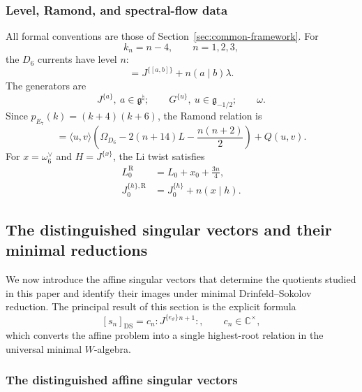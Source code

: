 \documentclass[11pt,reqno]{amsart}
\theoremstyle{definition}
\theoremstyle{remark}
\begin{document}
\subsubsection{Level, Ramond, and spectral-flow data}


All formal conventions are those of Section~\ref{sec:common-framework}.  For
\begin{equation*}
 k_n=n-4,\qquad n=1,2,3,
\end{equation*}
the $D_6$ currents have level $n$:
\begin{equation}
 [J^{\{a\}}{}_{\lambda}J^{\{b\}}]
 =J^{\{[a,b]\}}+n(a\mid b)\lambda.
 \label{e7:eq:E7-D6-current-relation-n}
\end{equation}
The generators are
\begin{equation}
 J^{\{a\}},\ a\in\mathfrak g^\natural;
 \qquad G^{\{u\}},\ u\in\mathfrak g_{-1/2};
 \qquad \omega.
 \label{e7:eq:E7-minimal-W-strong-generators}
\end{equation}
Since $p_{E_7}(k)=(k+4)(k+6)$, the Ramond relation is
\begin{equation}
 [u,v]=\langle u,v\rangle
 \left(\Omega_{D_6}-2(n+14)L-\frac{n(n+2)}2\right)+Q(u,v).
 \label{e7:eq:E7-n-Ramond-Zhu-relation}
\end{equation}
\label{e7:subsec:E7-Li-delta-operator}
For $x=\omega_6^\vee$ and $H=J^{\{x\}}$, the Li twist satisfies
\begin{align}
 L_0^{\mathrm R}&=L_0+x_0+\frac{3n}{4},
 \label{e7:eq:E7-Li-Ramond-conformal-shift}\\
 J_0^{\{h\},\mathrm R}&=J_0^{\{h\}}+n(x\mid h).
 \label{e7:eq:E7-Li-Cartan-shift}
\end{align}

\subsection{The distinguished singular vectors and their minimal reductions}
\label{e7:sec:distinguished-singular-vectors}

We now introduce the affine singular vectors that determine the quotients
studied in this paper and identify their images under minimal
Drinfeld--Sokolov reduction.  The principal result of this section is the
explicit formula
\[
  [s_n]_{\mathrm{DS}}
  =c_n:J^{\{e_\vartheta\}}{}^{n+1}:,
  \qquad c_n\in\mathbb C^\times,
\]
which converts the affine problem into a single highest-root relation in the
universal minimal \(W\)-algebra.

\subsubsection{The distinguished affine singular vectors}
\end{document}
